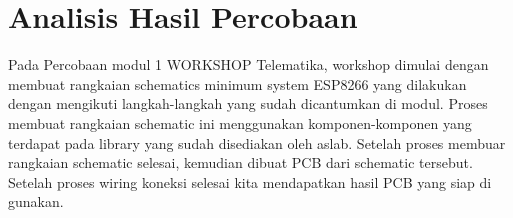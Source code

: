 \section*{Analisis Hasil Percobaan}
\indent
Pada Percobaan modul 1 WORKSHOP Telematika, workshop dimulai dengan membuat rangkaian schematics minimum system ESP8266 yang dilakukan dengan mengikuti langkah-langkah yang sudah dicantumkan di modul. Proses membuat rangkaian schematic ini menggunakan komponen-komponen yang terdapat pada library yang sudah disediakan oleh aslab. Setelah proses membuar rangkaian schematic selesai, kemudian dibuat PCB dari schematic tersebut. Setelah proses wiring koneksi selesai kita mendapatkan hasil PCB yang siap di gunakan.



